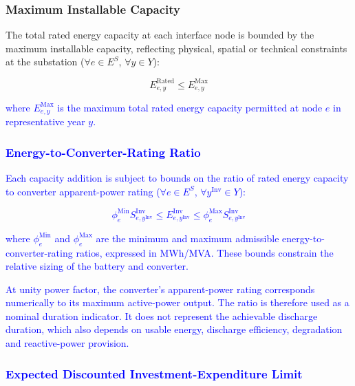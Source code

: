 \documentclass[preprint,12pt]{elsarticle}
\begin{document}
\subsubsection{Maximum Installable Capacity}

The total rated energy capacity at each interface node is bounded by the maximum installable capacity, reflecting physical, spatial or technical constraints at the substation ($\forall e\in E^S$, $\forall y\in Y$):

\begin{equation}
    E_{e,y}^{\text{Rated}} \leq E^{\text{Max}}_{e,y}
\end{equation}

\noindent
\textcolor{blue}{
    where $E^{\text{Max}}_{e,y}$ is the maximum total rated energy capacity permitted at node $e$ in representative year $y$.
}

\subsubsection{\textcolor{blue}{Energy-to-Converter-Rating Ratio}}

\textcolor{blue}{
    Each capacity addition is subject to bounds on the ratio of rated energy capacity to converter apparent-power rating ($\forall e\in E^S$, $\forall y^{\text{Inv}}\in Y$):
}

\textcolor{blue}{
    \begin{equation}
        \phi^{\text{Min}}_e S^{\text{Inv}}_{e,y^{\text{Inv}}} \leq 
        E^{\text{Inv}}_{e,y^{\text{Inv}}} \leq 
        \phi^{\text{Max}}_e S^{\text{Inv}}_{e,y^{\text{Inv}}}
        \label{eq:master_duration}
    \end{equation}
}

\noindent
\textcolor{blue}{
    where $\phi^{\text{Min}}_e$ and $\phi^{\text{Max}}_e$ are the minimum and maximum admissible energy-to-converter-rating ratios, expressed in MWh/MVA. These bounds constrain the relative sizing of the battery and converter.
}

\textcolor{blue}{
    At unity power factor, the converter's apparent-power rating corresponds numerically to its maximum active-power output. The ratio is therefore used as a nominal duration indicator. It does not represent the achievable discharge duration, which also depends on usable energy, discharge efficiency, degradation and reactive-power provision.
}

\subsubsection{\textcolor{blue}{Expected Discounted Investment-Expenditure Limit}}
\end{document}

